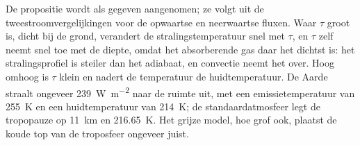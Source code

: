 De propositie wordt als gegeven aangenomen; ze volgt uit de tweestroomvergelijkingen voor
de opwaartse en neerwaartse fluxen. Waar $\tau$ groot is, dicht bij de grond,
verandert de stralingstemperatuur snel met $\tau$, en $\tau$ zelf
neemt snel toe met de diepte, omdat het absorberende gas daar het dichtst is: het
stralingsprofiel is steiler dan het adiabaat, en convectie neemt het over.
Hoog omhoog is $\tau$ klein en nadert de temperatuur de
huidtemperatuur. De Aarde straalt ongeveer \qty{239}{W.m^{-2}} naar de ruimte uit, met
een emissietemperatuur van \qty{255}{K} en een huidtemperatuur van
\qty{214}{K}; de standaardatmosfeer legt de tropopauze op \qty{11}{km}
en \qty{216.65}{K}. Het grijze model, hoe grof ook, plaatst de koude top van de
troposfeer ongeveer juist.

